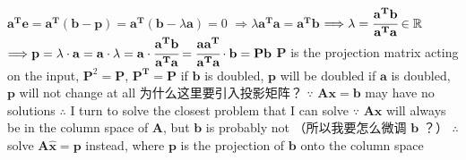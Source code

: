 \documentclass[12pt, a4paper]{article}
\begin{document}
{\begin{center}
\end{center}
\begin{math}
	{\mathbf{a^{T}}}{\mathbf{e}} = {\mathbf{a^{T}}}({\mathbf{b}}-{\mathbf{p}}) = {\mathbf{a^{T}}}({\mathbf{b}}-\lambda{\mathbf{a}}) = 0
\end{math}
\newline
\begin{math}
	\Longrightarrow
	\lambda{\mathbf{a^{T}}}{\mathbf{a}} = {\mathbf{a^{T}}}{\mathbf{b}}
\end{math}
\newline
\begin{math}
	\Longrightarrow
	\lambda = \cfrac{{\mathbf{a^{T}}}{\mathbf{b}}}{{\mathbf{a^{T}}}{\mathbf{a}}}
	\in {\mathbb{R}}
\end{math}
\newline
\begin{math}
	\Longrightarrow
	{\mathbf{p}} = \lambda\cdot{\mathbf{a}} = {\mathbf{a}}\cdot\lambda = {\mathbf{a}}\cdot\cfrac{{\mathbf{a^{T}}}{\mathbf{b}}}{{\mathbf{a^{T}}}{\mathbf{a}}} = 
	\cfrac{{\mathbf{a}}{\mathbf{a^{T}}}}{{\mathbf{a^{T}}}{\mathbf{a}}}\cdot{\mathbf{b}} = {\mathbf{P}}{\mathbf{b}}
\end{math}
\vspace{14pt}
\newline
${\mathbf{P}}$ is the projection matrix acting on the input, ${\mathbf{P}}^2={\mathbf{P}}$, ${\mathbf{P^{T}}}={\mathbf{P}}$
\newline
if ${\mathbf{b}}$ is doubled, ${\mathbf{p}}$ will be doubled
\newline
if ${\mathbf{a}}$ is doubled, ${\mathbf{p}}$ will not change at all
\vspace{31pt}
\newline
为什么这里要引入投影矩阵？
\newline
$\because$ ${\mathbf{A}}{\mathbf{x}}={\mathbf{b}}$ may have no solutions
\newline
$\therefore$ I turn to solve the closest problem that I can solve
\newline
$\because$ ${\mathbf{A}}{\mathbf{x}}$ will always be in the column space of ${\mathbf{A}}$, but ${\mathbf{b}}$ is probably not
\newline
（所以我要怎么微调 ${\mathbf{b}}$ ？）
\newline
$\therefore$ solve ${\mathbf{A}}{\mathbf{\hat{x}}}={\mathbf{p}}$ instead, where ${\mathbf{p}}$ is the projection of ${\mathbf{b}}$ onto the column space
\vspace{31pt}
\newline
}
\end{document}
